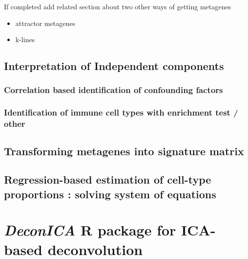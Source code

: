 \documentclass[12pt,]{book}
\providecommand{\tightlist}{%
  \setlength{\itemsep}{0pt}\setlength{\parskip}{0pt}}
\theoremstyle{definition}
\theoremstyle{definition}
\theoremstyle{definition}
\theoremstyle{remark}
\begin{document}
If completed add related section about two other ways of getting
metagenes

\begin{itemize}
\tightlist
\item
  attractor metagenes
\item
  k-lines
\end{itemize}

\hypertarget{interpretation-of-independent-components}{%
\subsection{Interpretation of Independent
components}\label{interpretation-of-independent-components}}

\hypertarget{correlation-based-identification-of-confounding-factors}{%
\subsubsection{Correlation based identification of confounding
factors}\label{correlation-based-identification-of-confounding-factors}}

\hypertarget{identification-of-immune-cell-types-with-enrichment-test-other}{%
\subsubsection{Identification of immune cell types with enrichment test
/
other}\label{identification-of-immune-cell-types-with-enrichment-test-other}}

\hypertarget{transforming-metagenes-into-signature-matrix}{%
\subsection{Transforming metagenes into signature
matrix}\label{transforming-metagenes-into-signature-matrix}}

\hypertarget{regression-based-estimation-of-cell-type-proportions-solving-system-of-equations}{%
\subsection{Regression-based estimation of cell-type proportions :
solving system of
equations}\label{regression-based-estimation-of-cell-type-proportions-solving-system-of-equations}}

\hypertarget{deconica-r-package-for-ica-based-deconvolution}{%
\section{\texorpdfstring{\emph{DeconICA} R package for ICA-based
deconvolution}{DeconICA R package for ICA-based deconvolution}}\label{deconica-r-package-for-ica-based-deconvolution}}
\end{document}
